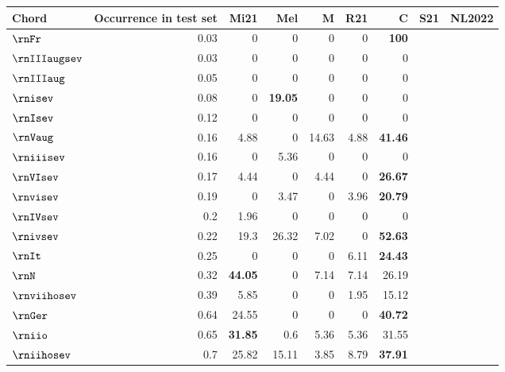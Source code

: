 \begin{tabular}{l|rrrrrr}
Chord & Occurrence in test set & Mi21           & Mel            & M&R21 & C&S21 & NL2022         \\ \hline
$\rnFr$   & 0.03                   & 0              & 0              & 0     & 0     & \textbf{100}   \\
$\rnIIIaugsev$ & 0.03                   & 0              & 0              & 0     & 0     & 0              \\
$\rnIIIaug$  & 0.05                   & 0              & 0              & 0     & 0     & 0              \\
$\rnisev$    & 0.08                   & 0              & \textbf{19.05} & 0     & 0     & 0              \\
$\rnIsev$    & 0.12                   & 0              & 0              & 0     & 0     & 0              \\
$\rnVaug$    & 0.16                   & 4.88           & 0              & 14.63 & 4.88  & \textbf{41.46} \\
$\rniiisev$  & 0.16                   & 0              & 5.36           & 0     & 0     & 0              \\
$\rnVIsev$   & 0.17                   & 4.44           & 0              & 4.44  & 0     & \textbf{26.67} \\
$\rnvisev$   & 0.19                   & 0              & 3.47           & 0     & 3.96  & \textbf{20.79} \\
$\rnIVsev$   & 0.2                    & 1.96           & 0              & 0     & 0     & 0              \\
$\rnivsev$   & 0.22                   & 19.3           & 26.32          & 7.02  & 0     & \textbf{52.63} \\
$\rnIt$    & 0.25                   & 0              & 0              & 0     & 6.11  & \textbf{24.43} \\
$\rnN$     & 0.32                   & \textbf{44.05} & 0              & 7.14  & 7.14  & 26.19          \\
$\rnviihosev$ & 0.39                   & 5.85           & 0              & 0     & 1.95  & 15.12          \\
$\rnGer$  & 0.64                   & 24.55          & 0              & 0     & 0     & \textbf{40.72} \\
$\rniio$   & 0.65                   & \textbf{31.85} & 0.6            & 5.36  & 5.36  & 31.55          \\
$\rniihosev$  & 0.7                    & 25.82          & 15.11          & 3.85  & 8.79  & \textbf{37.91} \\

\end{tabular}
